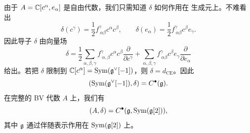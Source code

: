 

由于 $A=\mathbb{C}[c^\alpha,e_\alpha]$ 是自由代数，我们只需知道 $\delta$ 如何作用在
生成元上。不难看出
\[
  \delta(c^\gamma)=\frac{1}{2}f^{\gamma}_{\ \alpha\beta}c^\alpha c^\beta,
  \qquad
  \delta(e_\alpha)=\frac{1}{2}f^{\gamma}_{\ \alpha\beta}c^\beta e_\gamma.
\]
因此导子 $\delta$ 由向量场
\[
  \delta=\frac{1}{2}\sum_{\alpha,\beta,\gamma}
  f^{\gamma}_{\ \alpha,\beta}c^\alpha c^\beta
  \frac{\partial}{\partial c^\gamma}
  +\sum_{\alpha,\beta,\gamma}
  f^{\gamma}_{\ \alpha\beta}c^\beta e_\gamma
  \frac{\partial}{\partial e_\alpha}
\]
给出。若把 $\delta$ 限制到 $\mathbb{C}[c^\alpha]=\operatorname{Sym}(\mathfrak{g}^{\vee}[-1])$，则
$\delta=d_{\mathrm{CE}}$。因此
\[
  \left(\operatorname{Sym}(\mathfrak{g}^{\vee}[-1]),\delta\right)=C^{\bullet}(\mathfrak{g}).
\]
在完整的 BV 代数 $A$ 上，我们有
\[
  (A,\delta)=C^{\bullet}(\mathfrak{g},\operatorname{Sym}(\mathfrak{g}[2])),
\]
其中 $\mathfrak{g}$ 通过伴随表示作用在 $\operatorname{Sym}(\mathfrak{g}[2])$ 上。


